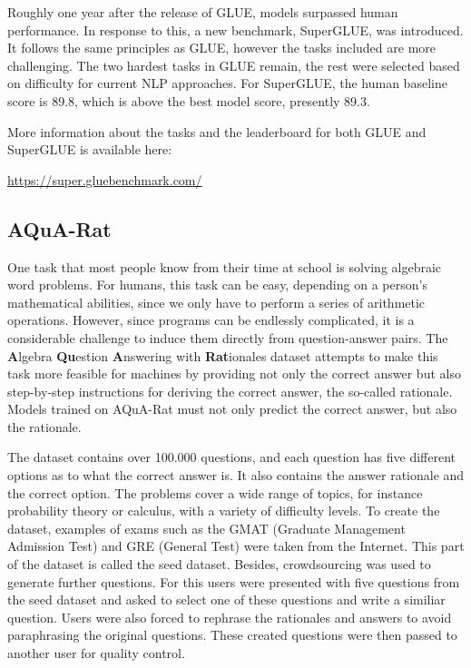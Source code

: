 \documentclass[]{krantz}
\begin{document}
Roughly one year after the release of GLUE, models surpassed human performance. In response to this, a new benchmark, SuperGLUE, was introduced. It follows the same principles as GLUE, however the tasks included are more challenging. The two hardest tasks in GLUE remain, the rest were selected based on difficulty for current NLP approaches. \citep{wang2019superglue}
For SuperGLUE, the human baseline score is 89.8, which is above the best model score, presently 89.3.

More information about the tasks and the leaderboard for both GLUE and SuperGLUE is available here:

\center \url{https://super.gluebenchmark.com/}

\flushleft

\hypertarget{aqua-rat}{%
\subsection{AQuA-Rat}\label{aqua-rat}}

One task that most people know from their time at school is solving algebraic word problems. For humans, this task can be easy, depending on a person's mathematical abilities, since we only have to perform a series of arithmetic operations. However, since programs can be endlessly complicated, it is a considerable challenge to induce them directly from question-answer pairs. The \textbf{A}lgebra \textbf{Qu}estion \textbf{A}nswering with \textbf{Rat}ionales dataset attempts to make this task more feasible for machines by providing not only the correct answer but also step-by-step instructions for deriving the correct answer, the so-called rationale. Models trained on AQuA-Rat must not only predict the correct answer, but also the rationale.

The dataset contains over 100.000 questions, and each question has five different options as to what the correct answer is. It also contains the answer rationale and the correct option. The problems cover a wide range of topics, for instance probability theory or calculus, with a variety of difficulty levels. To create the dataset, examples of exams such as the GMAT (Graduate Management Admission Test) and GRE (General Test) were taken from the Internet. This part of the dataset is called the seed dataset.
Besides, crowdsourcing was used to generate further questions. For this users were presented with five questions from the seed dataset and asked to select one of these questions and write a similiar question. Users were also forced to rephrase the rationales and answers to avoid paraphrasing the original questions.
These created questions were then passed to another user for quality control.
\end{document}
